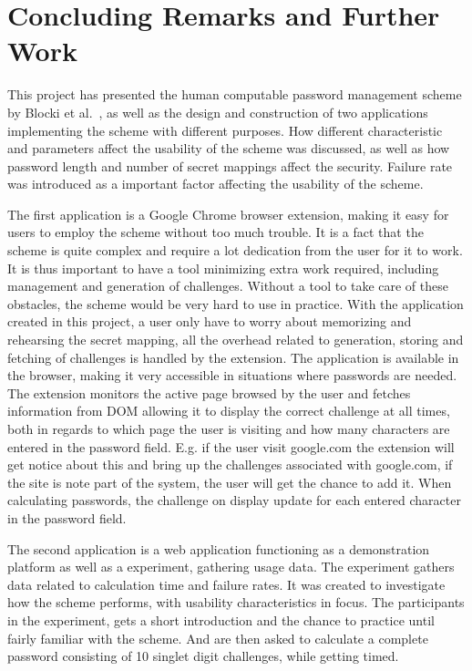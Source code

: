 \chapter{Concluding Remarks and Further Work}
This project has presented the human computable password management scheme by Blocki et al.~\cite{hcp-blocki}, as well as the design and construction of two applications implementing the scheme with different purposes. How different characteristic and parameters affect the usability of the scheme was discussed, as well as how password length and number of secret mappings affect the security. Failure rate was introduced as a important factor affecting the usability of the scheme. 
\par The first application is a Google Chrome browser extension, making it easy for users to employ the scheme without too much trouble. It is a fact that the scheme is quite complex and require a lot dedication from the user for it to work. It is thus important to have a tool minimizing extra work required, including management and generation of challenges. Without a tool to take care of these obstacles, the scheme would be very hard to use in practice. With the application created in this project, a user only have to worry about memorizing and rehearsing the secret mapping, all the overhead related to generation, storing and fetching of challenges is handled by the extension. The application is available in the browser, making it very accessible in situations where passwords are needed. The extension monitors the active page browsed by the user and fetches information from DOM allowing it to display the correct challenge at all times, both in regards to which page the user is visiting and how many characters are entered in the password field. E.g. if the user visit google.com the extension will get notice about this and bring up the challenges associated with google.com, if the site is note part of the system, the user will get the chance to add it. When calculating passwords, the challenge on display update for each entered character in the password field.
\par The second application is a web application functioning as a demonstration platform as well as a experiment, gathering usage data. The experiment gathers data related to calculation time and failure rates. It was created to investigate how the scheme performs, with usability characteristics in focus. The participants in the experiment, gets a short introduction and the chance to practice until fairly familiar with the scheme. And are then asked to calculate a complete password consisting of 10 singlet digit challenges, while getting timed.
